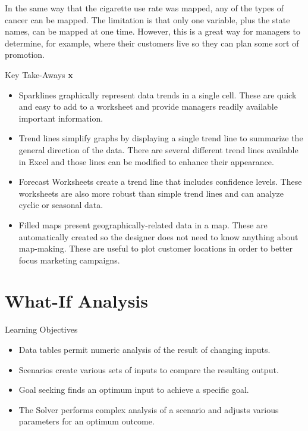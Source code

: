 In the same way that the cigarette use rate was mapped, any of the types of cancer can be mapped. The limitation is that only one variable, plus the state names, can be mapped at one time. However, this is a great way for managers to determine, for example, where their customers live so they can plan some sort of promotion.

\begin{center}
	\begin{tkwbox}{Key Take-Aways}
		\textbf{x}
		\\
		\begin{itemize}
			\setlength{\itemsep}{0pt}
			\setlength{\parskip}{0pt}
			\setlength{\parsep}{0pt}
			
			\item Sparklines graphically represent data trends in a single cell. These are quick and easy to add to a worksheet and provide managers readily available important information.
			\item Trend lines simplify graphs by displaying a single trend line to summarize the general direction of the data. There are several different trend lines available in Excel and those lines can be modified to enhance their appearance.
			\item Forecast Worksheets create a trend line that includes confidence levels. These worksheets are also more robust than simple trend lines and can analyze cyclic or seasonal data.
			\item Filled maps present geographically-related data in a map. These are automatically created so the designer does not need to know anything about map-making. These are useful to plot customer locations in order to better focus marketing campaigns.
			
		\end{itemize}
	\end{tkwbox}
\end{center}

\section{What-If Analysis}

\begin{center}
	\begin{objbox}{Learning Objectives}
		\begin{itemize}
			\setlength{\itemsep}{0pt}
			\setlength{\parskip}{0pt}
			\setlength{\parsep}{0pt}
			
			\item Data tables permit numeric analysis of the result of changing inputs.
			\item Scenarios create various sets of inputs to compare the resulting output.
			\item Goal seeking finds an optimum input to achieve a specific goal.
			\item The Solver performs complex analysis of a scenario and adjusts various parameters for an optimum outcome.
			
		\end{itemize}
	\end{objbox}
\end{center}

